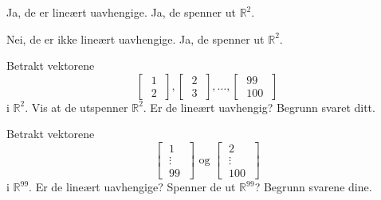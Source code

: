 \begin{losning}

\begin{punkt}
Ja, de er lineært uavhengige. Ja, de spenner ut $\mathbb{R}^2$.
\end{punkt}

\begin{punkt}
Nei, de er ikke lineært uavhengige. Ja, de spenner ut $\mathbb{R}^2$.
\end{punkt}

\end{losning}


\begin{oppgave}
\begin{punkt}
Betrakt vektorene
\[ 
\begin{bmatrix} \;1\; \\ \;2\; \end{bmatrix}, 
\begin{bmatrix} \;2\; \\ \;3\; \end{bmatrix}, \dots, 
\begin{bmatrix} \;99\; \\ \;100\; \end{bmatrix}
\]
i $\mathbb{R}^2$. Vis at de utspenner $\mathbb{R}^2$. Er de lineært uavhengig? Begrunn svaret ditt.
\end{punkt}

\begin{punkt}
Betrakt vektorene
\[ 
\begin{bmatrix} 
\;1\; \\ 
\;\vdots\; \\ 
\;99\; 
\end{bmatrix}
\text{ og }
\begin{bmatrix} 
\;2\; \\ 
\;\vdots\; \\ 
\;100\; 
\end{bmatrix}
\]
i $\mathbb{R}^{99}$. Er de lineært uavhengige? Spenner de ut $\mathbb{R}^{99}$? Begrunn svarene dine.

\end{punkt}
\end{oppgave}


